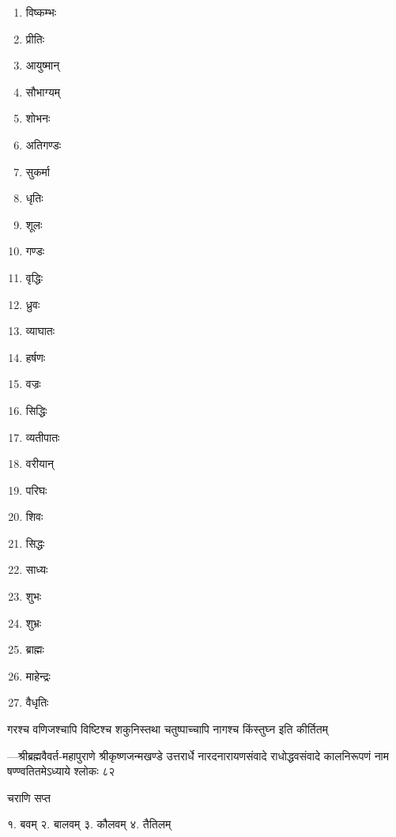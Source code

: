 \begin{multicols}{3}
  \begin{enumerate}\itemsep-1ex

    \item विष्कम्भः
    \item प्रीतिः
    \item आयुष्मान्
    \item सौभाग्यम्
    \item शोभनः
    \item अतिगण्डः
    \item सुकर्मा
    \item धृतिः
    \item शूलः
    \item गण्डः
    \item वृद्धिः
    \item ध्रुवः
    \item व्याघातः
    \item हर्षणः
    \item वज्रः
    \item सिद्धिः
    \item व्यतीपातः
    \item वरीयान्
    \item परिघः
    \item शिवः
    \item सिद्धः
    \item साध्यः
    \item शुभः
    \item शुभ्रः
    \item ब्राह्मः
    \item माहेन्द्रः
    \item वैधृतिः

  \end{enumerate}
\end{multicols}


{गरश्च वणिजश्चापि विष्टिश्च शकुनिस्तथा}
{चतुष्पाच्चापि नागश्च किंस्तुघ्न इति कीर्तितम्}

{\fontsize{10}{4}\selectfont ---श्रीब्रह्मवैवर्त-महापुराणे श्रीकृष्णजन्मखण्डे उत्तरार्धे नारदनारायणसंवादे राधोद्धवसंवादे कालनिरूपणं नाम षण्ण्वतितमेऽध्याये श्लोकः ८२}


{चराणि सप्त}

१. बवम् \hspace{2ex} २. बालवम् \hspace{2ex} ३. कौलवम् \hspace{2ex} ४. तैतिलम्

